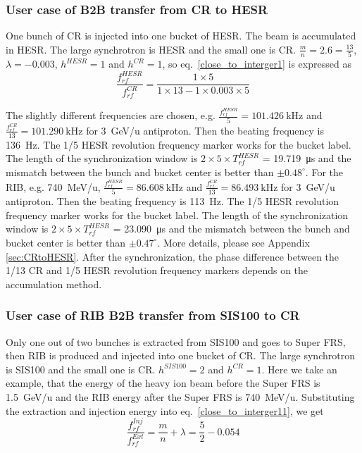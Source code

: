 \subsubsection{User case of B2B transfer from CR to HESR} 

One bunch of CR is injected into one bucket of HESR. The beam is accumulated in HESR. The large synchrotron is HESR and the small one is CR. $\frac{m}{n}=2.6=\frac{13}{5}$, $\lambda=-0.003$, $h^{HESR}=1$ and $h^{CR}=1$, so eq.~\ref{close_to_interger1} is expressed as
\begin{equation} 
\frac{f_{rf}^{HESR}}{f_{rf}^{CR}}=\frac{1\times 5}{1 \times 13- 1 \times 0.003\times 5}
\end{equation}

The slightly different frequencies are chosen, e.g. $\frac{f_{rf}^{HESR}}{5}=\SI{101.426}{\kHz}$ and $\frac{f_{rf}^{CR}}{13}=\SI{101.290}{\kHz}$ for \SI{3}{GeV/\atomicmassunit} antiproton. Then the beating frequency is \SI{136}{\Hz}. The 1/5 HESR revolution frequency marker works for the bucket label. The length of the synchronization window is $2\times 5\times T_{rf}^{HESR}$ = \SI{19.719}{\us} and the mismatch between the bunch and bucket center is better than $\pm0.48^\circ$. For the RIB, e.g. \SI{740}{MeV/\atomicmassunit}, $\frac{f_{rf}^{HESR}}{5}=\SI{86.608}{\kHz}$ and $\frac{f_{rf}^{CR}}{13}=\SI{86.493}{\kHz}$ for \SI{3}{GeV/\atomicmassunit} antiproton. Then the beating frequency is \SI{113}{\Hz}. The 1/5 HESR revolution frequency marker works for the bucket label. The length of the synchronization window is $2\times 5\times T_{rf}^{HESR}$ = \SI{23.090}{\us} and the mismatch between the bunch and bucket center is better than $\pm0.47^\circ$. More details, please see Appendix \ref{sec:CRtoHESR}. After the synchronization, the phase difference between the 1/13 CR and 1/5 HESR revolution frequency markers depends on the accumulation method.


\subsubsection{User case of RIB B2B transfer from SIS100 to CR} 
Only one out of two bunches is extracted from SIS100 and goes to Super FRS, then RIB is produced and injected into one bucket of CR. The large synchrotron is SIS100 and the small one is CR. $h^{SIS100}=2$ and $h^{CR}=1$. Here we take an example, that the energy of the heavy ion beam before the Super FRS is \SI{1.5}{GeV/\atomicmassunit} and the RIB energy after the Super FRS is \SI{740}{MeV/\atomicmassunit}. Substituting the extraction and injection energy into eq.~\ref{close_to_interger11}, we get
\begin{equation} 
\frac{f_{rf}^{Inj}}{f_{rf}^{Ext}}=\frac{m}{n}+ \lambda=\frac{5}{2}-0.054
\end{equation}

